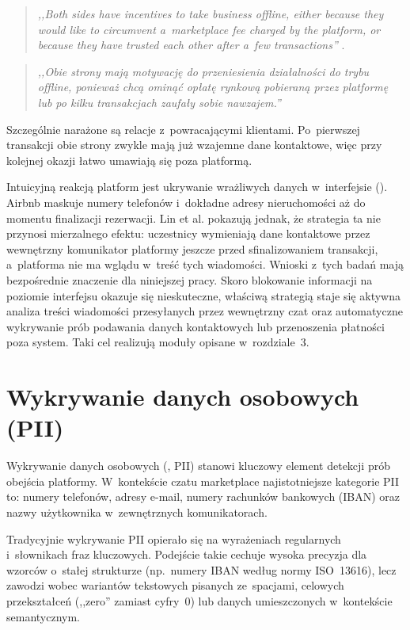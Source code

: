 \begin{quote}
\textit{,,Both sides have incentives to take business offline, either because
they would like to circumvent a~marketplace fee charged by the platform, or
because they have trusted each other after a~few transactions''}
\cite{bib:lin2022airbnb}.
\end{quote}

\begin{quote}
\textit{,,Obie strony mają motywację do przeniesienia działalności do trybu offline, ponieważ chcą ominąć opłatę rynkową pobieraną przez platformę lub po kilku transakcjach zaufały sobie nawzajem.''}
\end{quote}
Szczególnie narażone są relacje z~powracającymi klientami. Po~pierwszej transakcji
obie strony zwykle mają już wzajemne dane kontaktowe, więc przy kolejnej okazji
łatwo umawiają się poza platformą.

Intuicyjną reakcją platform jest ukrywanie wrażliwych danych w~interfejsie
(). Airbnb maskuje numery telefonów i~dokładne
adresy nieruchomości aż do momentu finalizacji rezerwacji. Lin et al.
\cite{bib:lin2022airbnb} pokazują jednak, że strategia ta nie przynosi mierzalnego
efektu: uczestnicy wymieniają dane kontaktowe przez wewnętrzny komunikator
platformy jeszcze przed sfinalizowaniem transakcji, a~platforma nie ma wglądu
w~treść tych wiadomości.
Wnioski z~tych badań mają bezpośrednie znaczenie dla niniejszej pracy. Skoro
blokowanie informacji na poziomie interfejsu okazuje się nieskuteczne, właściwą
strategią staje się aktywna analiza treści wiadomości przesyłanych przez wewnętrzny
czat oraz automatyczne wykrywanie prób podawania danych kontaktowych lub
przenoszenia płatności poza system. Taki cel realizują moduły opisane w~rozdziale~3.

\section{Wykrywanie danych osobowych (PII)}
\label{sec:pii}

Wykrywanie danych osobowych (, PII)
stanowi kluczowy element detekcji prób obejścia platformy. W~kontekście czatu
marketplace najistotniejsze kategorie PII to: numery telefonów, adresy e-mail,
numery rachunków bankowych (IBAN) oraz nazwy użytkownika w~zewnętrznych
komunikatorach.

Tradycyjnie wykrywanie PII opierało się na wyrażeniach regularnych i~słownikach
fraz kluczowych. Podejście takie cechuje wysoka precyzja dla wzorców o~stałej
strukturze (np.\ numery IBAN według normy ISO~13616), lecz zawodzi wobec
wariantów tekstowych pisanych ze~spacjami, celowych przekształceń (,,zero''
zamiast cyfry~0) lub danych umieszczonych w~kontekście semantycznym.

